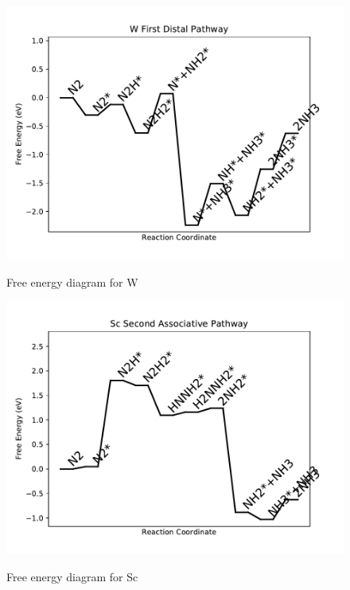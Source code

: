 \documentclass{article}
\begin{document}
\begin{figure}
\includegraphics[width=1\linewidth]{data/plots/W_distal_1.pdf}
\label{fig:W_distal_1}
\caption{Free energy diagram for W}
\end{figure}

\begin{figure}
\includegraphics[width=1\linewidth]{data/plots/Sc_associative_2.pdf}
\label{fig:Sc_associative_2}
\caption{Free energy diagram for Sc}
\end{figure}
\end{document}
